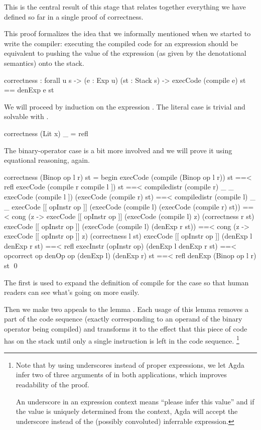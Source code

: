 This is the central result of this stage that relates together everything we
have defined so far in a single proof of correctness.

This proof formalizes the idea that we informally mentioned when we started to
write the compiler: executing the compiled code for an expression should be
equivalent to pushing the value of the expression (as given by the denotational
semantics) onto the stack.

\label{sec:cor-correctness}\begin{code}
  correctness : forall {u s}
    -> (e : Exp u) (st : Stack s)
    -> execCode (compile e) st == denExp e \scons st
\end{code}

\noindent We will proceed by induction on the expression . The literal
case is trivial and solvable with .

\begin{code}
  correctness (Lit x) _ = refl
\end{code}

\noindent The binary-operator case is a bit more involved and we will prove it
using equational reasoning, again.

\begin{code}
  correctness (Binop op l r) st = begin
    execCode (compile (Binop op l r)) st
      ==< refl \>
    execCode (compile r \app compile l \app [[ opInstr op ]]) st
      ==< compile\-distr (compile r) _ _ \>
    execCode (compile l \app [[ opInstr op ]]) (execCode (compile r) st)
      ==< compile\-distr (compile l) _ _ \>
    execCode [[ opInstr op ]] (execCode (compile l) (execCode (compile r) st))
      ==< cong (\lam z -> execCode [[ opInstr op ]] (execCode (compile l) z) (correctness r st) \>
    execCode [[ opInstr op ]] (execCode (compile l) (denExp r \scons st))
      ==< cong (\lam z -> execCode [[ opInstr op ]] z) (correctness l st) \>
    execCode [[ opInstr op ]] (denExp l \scons denExp r \scons st)
      ==< refl \>
    execInstr (opInstr op) (denExp l \scons denExp r \scons st)
      ==< op\-correct op \>
    denOp op (denExp l) (denExp r) \scons st
      ==< refl \>
    denExp (Binop op l r) \scons st
    \qed
\end{code}

\noindent The first  is used to expand the definition of compile
for the  case so that human readers can see what's going on more
easily.

Then we make two appeals to the lemma . Each usage of this
lemma removes a part of the code sequence (exactly corresponding to an operand
of the binary operator being compiled) and transforms it to the effect that this
piece of code has on the stack until only a single instruction is left in the
code sequence.%
\footnote{Note that by using underscores instead of proper expressions,
we let Agda infer two of three arguments of  in both applications,
which improves readability of the proof.

An underscore in an expression context means ``please infer this value'' and
if the value is uniquely determined from the context, Agda will accept the
underscore instead of the (possibly convoluted) inferrable expression.}

